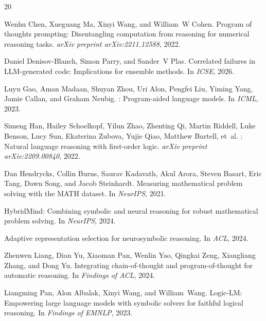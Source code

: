 \documentclass[11pt,a4paper]{article}
\begin{document}
\begin{thebibliography}{20}

Wenhu Chen, Xueguang Ma, Xinyi Wang, and William~W Cohen.
\newblock Program of thoughts prompting: Disentangling computation from reasoning for numerical reasoning tasks.
\newblock \emph{arXiv preprint arXiv:2211.12588}, 2022.

Daniel Denisov-Blanch, Simon Parry, and Sander~V Plas.
\newblock Correlated failures in LLM-generated code: Implications for ensemble methods.
\newblock In \emph{ICSE}, 2026.

Luyu Gao, Aman Madaan, Shuyan Zhou, Uri Alon, Pengfei Liu, Yiming Yang, Jamie Callan, and Graham Neubig.
: Program-aided language models.
\newblock In \emph{ICML}, 2023.

Simeng Han, Hailey Schoelkopf, Yilun Zhao, Zhenting Qi, Martin Riddell, Luke Benson, Lucy Sun, Ekaterina Zubova, Yujie Qiao, Matthew Burtell, et~al.
: Natural language reasoning with first-order logic.
\newblock \emph{arXiv preprint arXiv:2209.00840}, 2022.

Dan Hendrycks, Collin Burns, Saurav Kadavath, Akul Arora, Steven Basart, Eric Tang, Dawn Song, and Jacob Steinhardt.
\newblock Measuring mathematical problem solving with the {MATH} dataset.
\newblock In \emph{NeurIPS}, 2021.

HybridMind: Combining symbolic and neural reasoning for robust mathematical problem solving.
\newblock In \emph{NeurIPS}, 2024.

Adaptive representation selection for neurosymbolic reasoning.
\newblock In \emph{ACL}, 2024.

Zhenwen Liang, Dian Yu, Xiaoman Pan, Wenlin Yao, Qingkai Zeng, Xiangliang Zhang, and Dong Yu.
\newblock Integrating chain-of-thought and program-of-thought for automatic reasoning.
\newblock In \emph{Findings of ACL}, 2024.

Liangming Pan, Alon Albalak, Xinyi Wang, and William~Wang.
\newblock Logic-{LM}: Empowering large language models with symbolic solvers for faithful logical reasoning.
\newblock In \emph{Findings of EMNLP}, 2023.


\end{thebibliography}
\end{document}
